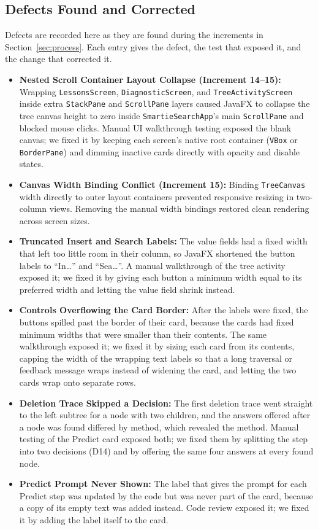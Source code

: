 \subsection{Defects Found and Corrected}
Defects are recorded here as they are found during the increments in Section~\ref{sec:process}. Each entry gives the defect, the test that exposed it, and the change that corrected it. \begin{itemize}
    \item \textbf{Nested Scroll Container Layout Collapse (Increment 14--15):} Wrapping \texttt{LessonsScreen}, \texttt{DiagnosticScreen}, and \texttt{TreeActivityScreen} inside extra \texttt{StackPane} and \texttt{ScrollPane} layers caused JavaFX to collapse the tree canvas height to zero inside \texttt{SmartieSearchApp}'s main \texttt{ScrollPane} and blocked mouse clicks. Manual UI walkthrough testing exposed the blank canvas; we fixed it by keeping each screen's native root container (\texttt{VBox} or \texttt{BorderPane}) and dimming inactive cards directly with opacity and disable states.
    \item \textbf{Canvas Width Binding Conflict (Increment 15):} Binding \texttt{TreeCanvas} width directly to outer layout containers prevented responsive resizing in two-column views. Removing the manual width bindings restored clean rendering across screen sizes.
    \item \textbf{Truncated Insert and Search Labels:} The value fields had a fixed width that left too little room in their column, so JavaFX shortened the button labels to ``In\ldots'' and ``Sea\ldots''. A manual walkthrough of the tree activity exposed it; we fixed it by giving each button a minimum width equal to its preferred width and letting the value field shrink instead.
    \item \textbf{Controls Overflowing the Card Border:} After the labels were fixed, the buttons spilled past the border of their card, because the cards had fixed minimum widths that were smaller than their contents. The same walkthrough exposed it; we fixed it by sizing each card from its contents, capping the width of the wrapping text labels so that a long traversal or feedback message wraps instead of widening the card, and letting the two cards wrap onto separate rows.
    \item \textbf{Deletion Trace Skipped a Decision:} The first deletion trace went straight to the left subtree for a node with two children, and the answers offered after a node was found differed by method, which revealed the method. Manual testing of the Predict card exposed both; we fixed them by splitting the step into two decisions (D14) and by offering the same four answers at every found node.
    \item \textbf{Predict Prompt Never Shown:} The label that gives the prompt for each Predict step was updated by the code but was never part of the card, because a copy of its empty text was added instead. Code review exposed it; we fixed it by adding the label itself to the card.
\end{itemize}

